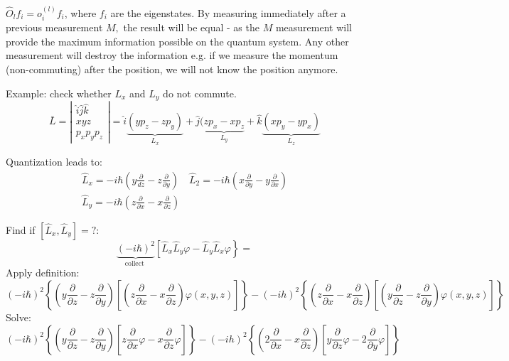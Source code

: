 $\hat{O}_lf_i=o_i^{(l)}f_i$, where $f_i$ are the eigenstates. By measuring immediately after a previous measurement $M,$ the result will be equal - as the $M$ measurement will provide the maximum information possible on the quantum system. Any other measurement will destroy the information e.g. if we measure the momentum (non-commuting) after the position, we will not know the position anymore.

Example: check whether $L_x$ and $L_y$ do not commute.
$$\bar{L}=\left|\begin{array}{ll}\hat{i} \hat{j} \hat{k} \\ x y z \\ p_{x} p_{y} p_{z}\end{array}\right|=\hat{i} \underbrace{\left(y p_{z}-z p_{y}\right)}_{L_{x}}+\hat{j}(\underbrace{z p_{x}-x p_{z}}_{L_{y}}+\hat{k} \underbrace{\left(x p_{y}-y p_{x}\right)}_{L_{z}}$$

Quantization leads to:
$$\begin{array}{l}
\hat{L}_{x}=-i \hbar\left(y \frac{\partial}{d z}-z \frac{\partial}{\partial y}\right) \quad \hat{L}_{2}=-i \hbar\left(x \frac{\partial}{\partial y}-y \frac{\partial}{\partial x}\right) \\
\hat{L}_{y}=-i \hbar\left(z \frac{\partial}{\partial x}-x \frac{\partial}{\partial z}\right)
\end{array}$$

Find if $\left[\hat{L}_{x}, \hat{L}_{y}\right]=?$:
$$
\underbrace{(-i \hbar)^{2}}_{\text {collect }}\left[\hat{L}_{x} \hat{L}_{y} \varphi-\hat{L}_{y} \hat{L}_{x}\varphi\right\}=
$$
Apply definition:
$$
(-i \hbar)^{2}\left\{\left(y \frac{\partial}{\partial z}-z \frac{\partial}{\partial y}\right)\left[\left(z \frac{\partial}{\partial x}-x \frac{\partial}{\partial z}\right) \varphi(x, y, z)\right]\right\}-(-i h)^{2}\left\{\left(z \frac{\partial}{\partial x}-x \frac{\partial}{\partial z}\right)\left[\left(y \frac{\partial}{\partial z}-z \frac{\partial}{\partial y}\right) \varphi(x, y, z)\right]\right\}
$$
Solve:
$$(-i \hbar)^{2}\left\{\left(y \frac{\partial}{\partial z}-z \frac{\partial}{\partial y}\right)\left[z \frac{\partial}{\partial x} \varphi-x \frac{\partial}{\partial z} \varphi\right]\right\}-(-i h)^{2}\left\{\left(2 \frac{\partial}{\partial x}-x \frac{\partial}{\partial z}\right)\left[y \frac{\partial}{\partial z} \varphi-2 \frac{\partial}{\partial y} \varphi\right]\right\}$$

